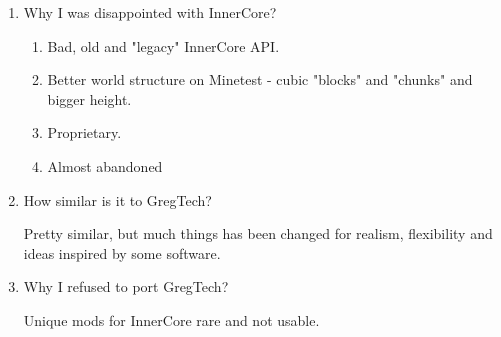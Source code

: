 \documentclass[12pt]{article}
\begin{document}
    \begin{enumerate}[i]
    \item Why I was disappointed with InnerCore?
    \begin{enumerate}
    \item Bad, old and "legacy" InnerCore API.
    \item Better world structure on Minetest - cubic "blocks" and "chunks" and bigger height.
    \item Proprietary. 
    \item Almost abandoned
    \end{enumerate}
    \item How similar is it to GregTech?

    Pretty similar, but much things has been changed for realism, flexibility and ideas inspired by some software.

    \item Why I refused to port GregTech?
    
    Unique mods for InnerCore rare and not usable.

    \end{enumerate}
\end{document}
